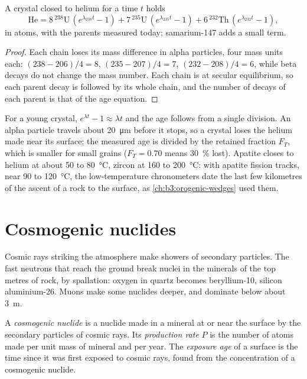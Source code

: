 \begin{theorem}\label{thm:b3:advanced-geochronology:helium}
A crystal closed to helium for a time $t$ holds
\[
\mathrm{He} = 8\,{}^{238}\mathrm U\,(e^{\lambda_{238}t} - 1)
+ 7\,{}^{235}\mathrm U\,(e^{\lambda_{235}t} - 1)
+ 6\,{}^{232}\mathrm{Th}\,(e^{\lambda_{232}t} - 1),
\]
in atoms, with the parents measured today; samarium-147 adds a small term.
\end{theorem}

\begin{proof}
Each chain loses its mass difference in alpha particles, four mass units each:
$(238 - 206)/4 = 8$, $(235 - 207)/4 = 7$, $(232 - 208)/4 = 6$, while beta
decays do not change the mass number. Each chain is at secular equilibrium,
so each parent decay is followed by its whole chain, and the number of
decays of each parent is that of the age equation.
\end{proof}

For a young crystal, $e^{\lambda t} - 1 \approx \lambda t$ and the age follows
from a single division. An alpha particle travels about
\qty{20}{\micro\metre} before it stops, so a crystal loses the helium made
near its surface; the measured age is divided by the retained fraction $F_T$,
which is smaller for small grains ($F_T = 0.70$ means \qty{30}{\percent}
lost). Apatite closes to helium at about 50 to \qty{80}{\celsius}, zircon at
160 to \qty{200}{\celsius}: with apatite fission tracks, near 90 to
\qty{120}{\celsius}, the low-temperature chronometers date the last few
kilometres of the ascent of a rock to the surface, as
\cref{ch:b3:orogenic-wedges} used them.

\section{Cosmogenic nuclides}\label{sec:b3:advanced-geochronology:cosmogenic}

Cosmic rays striking the atmosphere make showers of secondary particles. The
fast neutrons that reach the ground break nuclei in the minerals of the top
metres of rock, by spallation: oxygen in quartz becomes beryllium-10, silicon
aluminium-26. Muons make some nuclides deeper, and dominate below about
\qty{3}{m}.

\begin{definition}
\label{def:b3:advanced-geochronology:cosmogenic}
A \emph{cosmogenic nuclide} is a nuclide made in
a mineral at or near the surface by the secondary particles of cosmic rays. Its
\emph{production rate} $P$ is the number
of atoms made per unit mass of mineral and per year. The \emph{exposure
age} of a surface is the time since it was first exposed
to cosmic rays, found from the concentration of a cosmogenic nuclide.
\end{definition}

